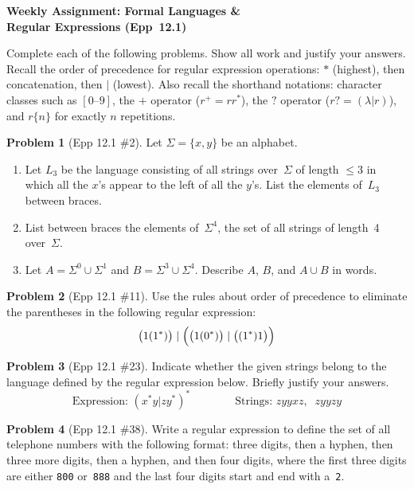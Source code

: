 \documentclass[11pt]{article}
\begin{document}
\begin{center}
  {\Large\bfseries Weekly Assignment: Formal Languages \&\\[2pt]
   Regular Expressions (Epp~12.1)}
\end{center}

\bigskip

\noindent
Complete each of the following problems.  Show all work and justify your answers.
Recall the order of precedence for regular expression operations:
$*$ (highest), then concatenation, then $|$ (lowest).
Also recall the shorthand notations: character classes such as
$[0\text{--}9]$, the $+$ operator ($r^+ = rr^*$), the $?$
operator ($r? = (\lambda | r)$), and $r\{n\}$ for exactly $n$
repetitions.

\bigskip

\noindent\textbf{Problem 1} (Epp 12.1 \#2). \;
Let $\Sigma = \{x, y\}$ be an alphabet.

\begin{enumerate}[label=\textbf{\alph*.},itemsep=4pt]
  \item Let $L_3$ be the language consisting of all strings
        over~$\Sigma$ of length $\le 3$ in which all the
        $x$'s appear to the left of all the $y$'s.  List the
        elements of~$L_3$ between braces.
  \item List between braces the elements of~$\Sigma^4$, the
        set of all strings of length~4 over~$\Sigma$.
  \item Let $A = \Sigma^0 \cup \Sigma^1$ and
        $B = \Sigma^3 \cup \Sigma^4$.  Describe $A$, $B$, and
        $A \cup B$ in words.
\end{enumerate}

\bigskip

\noindent\textbf{Problem 2} (Epp 12.1 \#11). \;
Use the rules about order of precedence to eliminate the
parentheses in the following regular expression:
\[
  \bigl(1(1^*)\bigr) \;|\;
  \Bigl(\bigl(1(0^*)\bigr) \;|\; \bigl((1^*)1\bigr)\Bigr)
\]

\bigskip

\noindent\textbf{Problem 3} (Epp 12.1 \#23). \;
Indicate whether the given strings belong to the language
defined by the regular expression below.  Briefly justify
your answers.
\[
  \text{Expression: } (x^*y | zy^*)^*
  \qquad\qquad
  \text{Strings: } zyyxz,\;\; zyyzy
\]

\bigskip

\noindent\textbf{Problem 4} (Epp 12.1 \#38). \;
Write a regular expression to define the set of all telephone
numbers with the following format: three digits, then a
hyphen, then three more digits, then a hyphen, and then four
digits, where the first three digits are either \texttt{800}
or~\texttt{888} and the last four digits start and end
with a~\texttt{2}.
\end{document}
